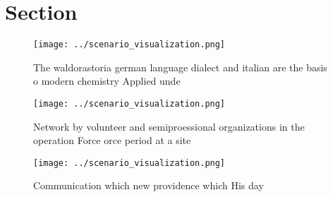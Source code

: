 \documentclass[a4paper]{article}
\begin{document}
\section{Section}

\begin{figure}
\centering
\texttt{[image: ../scenario\_visualization.png]}
\caption{The waldorastoria german language dialect and italian are the basis o modern chemistry Applied unde
}
\end{figure}
 
\begin{figure}
\centering
\texttt{[image: ../scenario\_visualization.png]}
\caption{Network by volunteer and semiproessional organizations in the operation Force orce period at a site
}
\end{figure}
 
\begin{figure}
\centering
\texttt{[image: ../scenario\_visualization.png]}
\caption{Communication which new providence which His day 
}
\end{figure}
 
\end{document}
